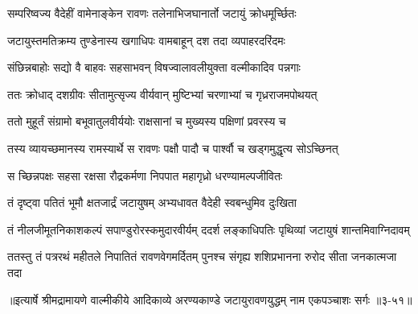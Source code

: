 \twolineshloka
{सम्परिष्वज्य वैदेहीं वामेनाङ्केन रावणः}
{तलेनाभिजघानार्तो जटायुं क्रोधमूर्च्छितः} %

\twolineshloka
{जटायुस्तमतिक्रम्य तुण्डेनास्य खगाधिपः}
{वामबाहून् दश तदा व्यपाहरदरिंदमः} %

\twolineshloka
{संछिन्नबाहोः सद्यो वै बाहवः सहसाभवन्}
{विषज्वालावलीयुक्ता वल्मीकादिव पन्नगाः} %

\twolineshloka
{ततः क्रोधाद् दशग्रीवः सीतामुत्सृज्य वीर्यवान्}
{मुष्टिभ्यां चरणाभ्यां च गृध्रराजमपोथयत्} %

\twolineshloka
{ततो मुहूर्तं संग्रामो बभूवातुलवीर्ययोः}
{राक्षसानां च मुख्यस्य पक्षिणां प्रवरस्य च} %

\twolineshloka
{तस्य व्यायच्छमानस्य रामस्यार्थे स रावणः}
{पक्षौ पादौ च पार्श्वौ च खड्गमुद्धृत्य सोऽच्छिनत्} %

\twolineshloka
{स च्छिन्नपक्षः सहसा रक्षसा रौद्रकर्मणा}
{निपपात महागृध्रो धरण्यामल्पजीवितः} %

\twolineshloka
{तं दृष्ट्वा पतितं भूमौ क्षतजार्द्रं जटायुषम्}
{अभ्यधावत वैदेही स्वबन्धुमिव दुःखिता} %

\twolineshloka
{तं नीलजीमूतनिकाशकल्पं सपाण्डुरोरस्कमुदारवीर्यम्}
{ददर्श लङ्काधिपतिः पृथिव्यां जटायुषं शान्तमिवाग्निदावम्} %

\twolineshloka
{ततस्तु तं पत्ररथं महीतले निपातितं रावणवेगमर्दितम्}
{पुनश्च संगृह्य शशिप्रभानना रुरोद सीता जनकात्मजा तदा} %


॥इत्यार्षे श्रीमद्रामायणे वाल्मीकीये आदिकाव्ये अरण्यकाण्डे जटायुरावणयुद्धम् नाम एकपञ्चाशः सर्गः ॥३-५१॥
